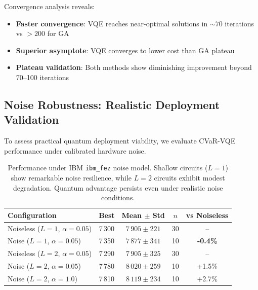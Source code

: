Convergence analysis reveals:
\begin{itemize}
    \item \textbf{Faster convergence}: VQE reaches near-optimal solutions in $\sim 70$ iterations vs $>200$ for GA
    \item \textbf{Superior asymptote}: VQE converges to lower cost than GA plateau
    \item \textbf{Plateau validation}: Both methods show diminishing improvement beyond 70--100 iterations
\end{itemize}

\subsection{Noise Robustness: Realistic Deployment Validation}

To assess practical quantum deployment viability, we evaluate CVaR-VQE performance under calibrated hardware noise.


\begin{table}[htb]
    \centering
    \caption{Performance under IBM \texttt{ibm\_fez} noise model. Shallow circuits ($L=1$) show remarkable noise resilience, while $L=2$ circuits exhibit modest degradation. Quantum advantage persists even under realistic noise conditions.}
    \label{tab:noise_robustness}
    \begin{tabular}{lcccc}
        \toprule
        Configuration & Best & Mean $\pm$ Std & $n$ & vs Noiseless \\
        \midrule
        Noiseless ($L=1$, $α=0.05$) & 7\,300 & $7\,905 \pm 221$ & 30 & -- \\
        Noise ($L=1$, $α=0.05$) & 7\,350 & $7\,877 \pm 341$ & 10 & \textbf{-0.4\%} \\
        \midrule
        Noiseless ($L=2$, $α=0.05$) & 7\,290 & $7\,905 \pm 325$ & 30 & -- \\
        Noise ($L=2$, $α=0.05$) & 7\,780 & $8\,020 \pm 259$ & 10 & +1.5\% \\
        Noise ($L=2$, $α=1.0$) & 7\,810 & $8\,119 \pm 234$ & 10 & +2.7\% \\
        \bottomrule
    \end{tabular}
\end{table}

